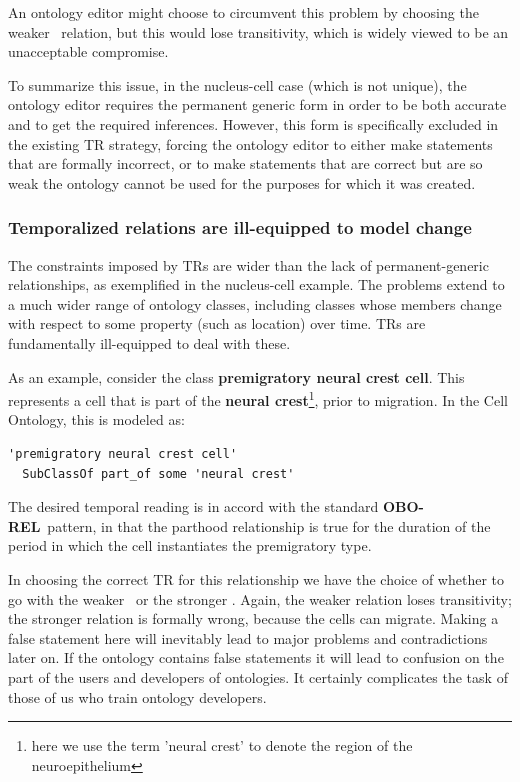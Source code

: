 \documentclass{bioinfo}
\def\partOfAtSomeTimes{\pr{part-of-at-some-times}}
\def\atAllTimes{\pr{at-all-times}}
\def\atSomeTimes{\pr{at-some-times}}
\def\OBOREL{\textbf{OBO-REL}}
\begin{document}
An ontology editor might choose to circumvent this problem by choosing
the weaker \partOfAtSomeTimes\ relation, but this would lose
transitivity, which is widely viewed to be an unacceptable compromise.

To summarize this issue, in the nucleus-cell case (which is not
unique), the ontology editor requires the permanent generic form in
order to be both accurate and to get the required inferences. However,
this form is specifically excluded in the existing TR strategy,
forcing the ontology editor to either make statements that are
formally incorrect, or to make statements that are correct but are so
weak the ontology cannot be used for the purposes for which it was
created.

\subsubsection{Temporalized relations are ill-equipped to model change}

The constraints imposed by TRs are wider than the lack of
permanent-generic relationships, as exemplified in the nucleus-cell
example. The problems extend to a much wider range of ontology
classes, including classes whose members change with respect to some
property (such as location) over time. TRs are fundamentally
ill-equipped to deal with these.

As an example, consider the class \textbf{premigratory neural crest
  cell}. This represents a cell that is part of the \textbf{neural
  crest}\footnote{here we use the term 'neural crest' to denote the
  region of the neuroepithelium}, prior to migration. In the Cell
Ontology, this is modeled as:

\begin{verbatim}
'premigratory neural crest cell' 
  SubClassOf part_of some 'neural crest'
\end{verbatim}

The desired temporal reading is in accord with the standard \OBOREL\
pattern, in that the parthood relationship is true for the duration of
the period in which the cell instantiates the premigratory type.

In choosing the correct TR for this relationship we have the choice of
whether to go with the weaker \atSomeTimes\ or the stronger
\atAllTimes. Again, the weaker relation loses transitivity; the
stronger relation is formally wrong, because the cells can
migrate. Making a false statement here will inevitably lead to major
problems and contradictions later on. If the ontology contains false
statements it will lead to confusion on the part of the users and
developers of ontologies. It certainly complicates the task of those
of us who train ontology developers.
\end{document}

